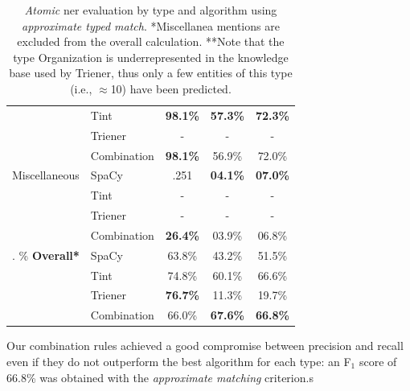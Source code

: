 \begin{table}[H]
\begin{tabular}{l|l|ccc}
                      & Tint    & \textbf{98.1\%} & \textbf{57.3\%} & \textbf{72.3\%}\\
                      & Trie\ac{ner}    & - & - & -\\
                      & Combination  & \textbf{98.1\%} & 56.9\% & 72.0\%\\
        \hline
        Miscellaneous & SpaCy   & .251 & \textbf{04.1\%} & \textbf{07.0\%}\\
                      & Tint    & - & - & -\\
                      & Trie\ac{ner}    & - & - & -\\
                      & Combination  & \textbf{26.4\%} & 03.9\% & 06.8\% \\
        \hline  . \%     \textbf{Overall*} & SpaCy   & 63.8\% & 43.2\% & 51.5\%\\
                      & Tint    & 74.8\% & 60.1\% & 66.6\% \\
                      & Trie\ac{ner}    & \textbf{76.7\%} & 11.3\% & 19.7\% \\
                      & Combination  & 66.0\% & \textbf{67.6\%} & \textbf{66.8\%} \\
    \end{tabular}
    \caption{\textit{Atomic} \ac{ner} evaluation by type and algorithm using \textit{approximate typed match}. *Miscellanea mentions are excluded from the overall calculation. **Note that the type Organization is underrepresented in the knowledge base used by Trie\ac{ner}, thus only a few entities of this type (i.e., $\approx$10) have been predicted.}
    \label{tab:nereval:bytype}
\end{table}

Our combination rules achieved a good compromise between precision and recall even if they do not outperform the best algorithm for each type: an F$_1$ score of 66.8\% was obtained with the \textit{approximate matching} criterion.s

